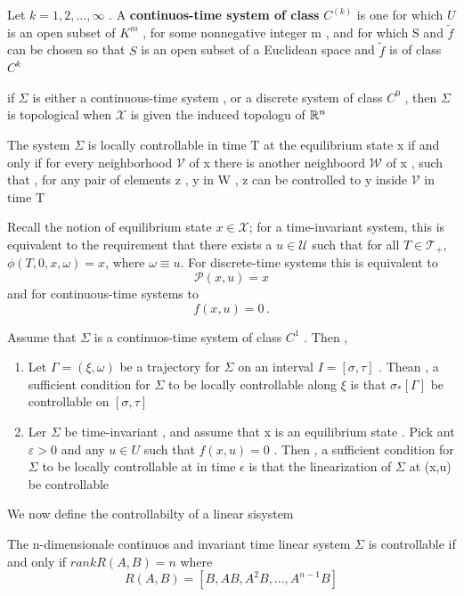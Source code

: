 \begin{definizione}
	Let $k = 1 , 2 , \dots , \infty $ . A \textbf{continuos-time system of class} $C^(k)$ is one for which $U$ is an open subset of $K^m$ , for some nonnegative integer  m , and for which S and $\tilde{f}$ can be chosen so that $S$ is an open subset of a Euclidean space and $\tilde{f}$ is of class $C^k$  
\end{definizione}
\begin{prop}
	if $\Sigma$ is either a continuous-time system , or a discrete system of class $C^0$ , then $\Sigma$ is topological when $\mathcal{X}$ is given the induced topologu of $\mathbb{R}^n$
\end{prop}
\begin{definizione}
	The system $\Sigma$ is locally controllable in time T at the equilibrium state x if and only if for every neighborhood $\mathcal{V} $ of x there is another neighboord $\mathcal{W}$ of x , such that , for any pair of elements z , y in W , z can be controlled to y inside $\mathcal{V}$ in time T 
\end{definizione}
Recall the notion of equilibrium state $x \in \mathcal{X}$; for a time-invariant system, this is equivalent to the requirement that there exists a $u \in \mathcal{U}$ such that for all $T \in \mathcal{T}_+$, $\phi(T,0,x,\omega) = x$, where $\omega \equiv u$. For discrete-time systems this is equivalent to
$$ \mathcal{P}(x,u) = x $$
and for continuous-time systems to
$$ f(x,u) = 0 \,. $$
\begin{teo}{}{}
 Assume that $\Sigma$ is a continuos-time system of class $C^1$ . Then , 
 \begin{enumerate}
 	\item Let $\Gamma = (\xi, \omega)$ be a trajectory for $\Sigma$ on an interval $I = [\sigma , \tau]$ . Thean , a sufficient condition for $\Sigma$ to be locally controllable along $\xi$ is that $\sigma_* [\Gamma]$ be controllable on $[\sigma , \tau]$ 
 \item Ler $\Sigma$ be time-invariant , and assume that x is an equilibrium state . Pick ant $\varepsilon >0$ and any $u \in U$ such that $f(x,u) = 0$ . Then , a sufficient condition for $\Sigma$ to be locally controllable at in time $\epsilon$ is that the linearization of $\Sigma$ at (x,u) be controllable
  \end{enumerate}
\end{teo}
We now define the controllabilty of a linear sisystem 
\begin{teo}{}{}
	The n-dimensionale continuos and invariant time  linear system $\Sigma$ is controllable if and only if $rank R(A,B) = n  $ where 
	\[R(A,B) = [ B , AB,A^2B,\dots , A^{n-1}B]\]
\end{teo}
